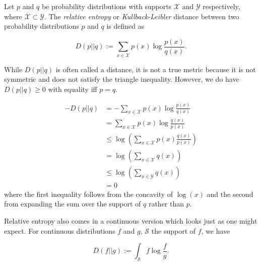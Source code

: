 \documentclass{article}
\newcommand{\defined}{:=}
\begin{document}
Let $p$ and $q$ be probability distributions with supports $\mathcal{X}$ and $\mathcal{Y}$ respectively, where  $ \mathcal{X} \subset \mathcal{Y}$.  The \emph{relative entropy} or \emph{Kullback-Leibler} distance between two probability distributions $p$ and $q$ is defined as

\begin{equation}
D(p||q) \defined \sum_{x \in \mathcal{X}} p(x) \log \frac{p(x)}{q(x)}.
\end{equation}

While $D(p||q)$ is often called a distance, it is not a true metric because it is not symmetric and does not satisfy the triangle inequality.  However, we do have $D(p||q) \ge 0$ with equality iff $p = q$.

\begin{align}
-D(p||q) &= -\sum_{x \in \mathcal{X}} p(x) \log \frac{p(x)}{q(x)}\\
 &= \sum_{x \in \mathcal{X}} p(x) \log \frac{q(x)}{p(x)}\\
 &\le \log \left(\sum_{x \in \mathcal{X}} p(x) \frac{q(x)}{p(x)} \right)\\
 &= \log \left(\sum_{x \in \mathcal{X}} q(x) \right)\\
 &\le \log \left(\sum_{x \in \mathcal{Y}} q(x) \right)\\
 &= 0
\end{align}
where the first inequality follows from the concavity of $\log(x)$ and the second from expanding the sum over the support of $q$ rather than $p$.

Relative entropy also comes in a continuous version which looks just as one might expect.  For continuous distributions $f$ and $g$, $\mathcal{S}$ the support of $f$, we have

\begin{equation}
D(f||g) \defined \int_{\mathcal{S}} f \log \frac{f}{g}.
\end{equation}
\end{document}
